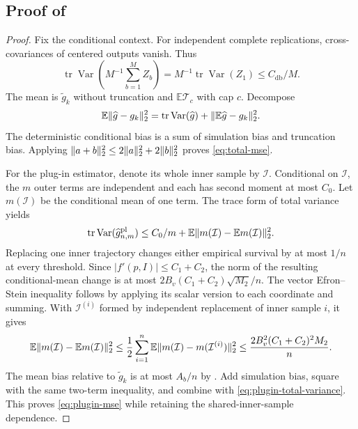 \documentclass[11pt]{article}
\newcommand{\E}{\mathbb E}
\newcommand{\Var}{\operatorname{Var}}
\newcommand{\1}{\mathbf 1}
\newcommand{\tr}{\operatorname{tr}}
\DeclarePairedDelimiter{\norm}{\lVert}{\rVert}
\newcommand{\db}{\mathrm{db}}
\newcommand{\pl}{\mathrm{pl}}
\theoremstyle{definition}
\begin{document}
\subsection{Proof of \texorpdfstring{}{the variance theorem}}
\begin{proof}
Fix the conditional context. For independent complete replications, cross-covariances of centered outputs vanish. Thus
\[
 \tr\Var\left(M^{-1}\sum_{b=1}^MZ_b\right)
 =M^{-1}\tr\Var(Z_1)\le C_{\db}/M.
\]
The mean is $\widetilde g_k$ without truncation and $\E \mathcal T_c$ with cap $c$. Decompose
\[
 \E\norm{\widehat g-g_k}_2^2
 =\tr\Var(\widehat g)+\norm{\E\widehat g-g_k}_2^2.
\]
The deterministic conditional bias is a sum of simulation bias and truncation bias. Applying $\norm{a+b}_2^2\le2\norm a_2^2+2\norm b_2^2$ proves \eqref{eq:total-mse}.

For the plug-in estimator, denote its whole inner sample by $\mathcal I$. Conditional on $\mathcal I$, the $m$ outer terms are independent and each has second moment at most $C_0$. Let $m(\mathcal I)$ be the conditional mean of one term. The trace form of total variance yields
\begin{equation}\label{eq:plugin-total-variance}
 \tr\Var(\widehat g_{n,m}^{\pl})
 \le C_0/m+\E\norm{m(\mathcal I)-\E m(\mathcal I)}_2^2.
\end{equation}
Replacing one inner trajectory changes either empirical survival by at most $1/n$ at every threshold. Since $|f'(p,I)|\le C_1+C_2$, the norm of the resulting conditional-mean change is at most
$2B_v(C_1+C_2)\sqrt{M_2}/n$.
The vector Efron--Stein inequality follows by applying its scalar version to each coordinate and summing. With $\mathcal I^{(i)}$ formed by independent replacement of inner sample $i$, it gives
\[
 \E\norm{m(\mathcal I)-\E m(\mathcal I)}_2^2
 \le\frac12\sum_{i=1}^n\E\norm{m(\mathcal I)-m(\mathcal I^{(i)})}_2^2
 \le\frac{2B_v^2(C_1+C_2)^2M_2}{n}.
\]
The mean bias relative to $\widetilde g_k$ is at most $A_b/n$ by . Add simulation bias, square with the same two-term inequality, and combine with \eqref{eq:plugin-total-variance}. This proves \eqref{eq:plugin-mse} while retaining the shared-inner-sample dependence.
\end{proof}
\end{document}
